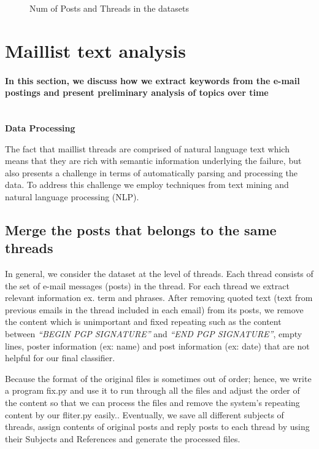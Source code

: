 \documentclass{sig-alternate}
\begin{document}
\begin{figure}[h]
\centering
{}
\caption{Num of Posts and Threads in the datasets}
\end{figure}

\section{Maillist text analysis}
\paragraph{In this section, we discuss how we extract keywords from the e-mail postings and present preliminary analysis of topics over time}
~\\
\textbf{Data Processing} 
\par The fact that maillist threads are comprised of natural language text which means that they are rich with semantic information underlying the failure, but also presents a challenge in terms of automatically parsing and processing the data. To address this challenge we employ techniques from text mining and natural language processing (NLP).

\subsection{Merge the posts that belongs to the same threads}
In general, we consider the dataset at the level of threads. Each thread consists of the set of e-mail messages (posts) in the thread. For each thread we extract relevant information ex. term and phrases.
After removing quoted text (text from previous emails in the thread included in each email) from its posts, we remove the content which is unimportant and fixed repeating such as the content between \textit{“BEGIN PGP SIGNATURE”} and \textit{“END PGP SIGNATURE”}, empty lines, poster information (ex: name) and post information (ex: date) that are not helpful for our final classifier.
\par Because the format of the original files is sometimes out of order; hence, we write a program fix.py and use it to  run through all the files and adjust the order of the content so that we can process the files and remove the system’s repeating content by our fliter.py easily.. Eventually, we save all different subjects of threads, assign contents of original posts and reply posts to each thread by using their Subjects and References and generate the processed files.
\end{document}
